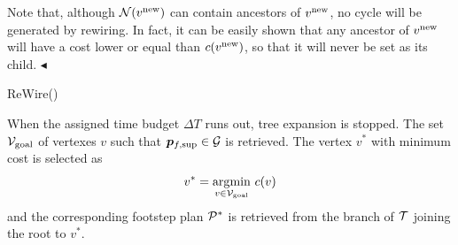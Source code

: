 Note that, although ${\cal N} (v^{\rm new})$ can contain ancestors of $v^{\rm new}$, no cycle will be generated by rewiring.
In fact, it can be easily shown that any ancestor of $v^{\rm new}$ will have a cost lower or equal than $c(v^{\rm new})$, so that it will never be set as its child.
\hfill $\blacktriangleleft$

\begin{procedure}%
	\small
	\removelatexerror
    \caption{ReWire()}
	\label{proc:rewire}

	\vspace{2pt}
    \BlankLine
			
		
	\Return\;	

\end{procedure}

\smallskip

When the assigned time budget ${\Delta T}$ runs out, tree expansion is stopped. The set ${\cal V}_{\rm goal}$ of vertexes $v$ such that ${\bm{p}}_{f,{\rm sup}} \in {\cal G}$ is retrieved.
The vertex $v^*$ with minimum cost is selected as
\begin{equation}
    \label{eq:WoS:BestVertex}
    v^* = \underset{v \in {\cal V}_{\rm goal}}{\arg\!\min} \ c(v)
\end{equation}
and the corresponding footstep plan ${\cal P}^*$ is retrieved from the branch of $\cal T$ joining the root to $v^*$.


